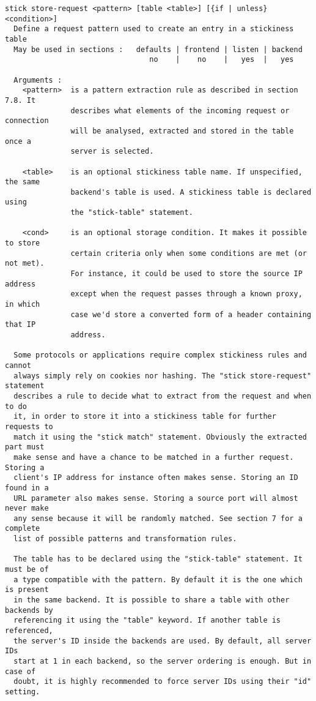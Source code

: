 \begin{verbatim}
stick store-request <pattern> [table <table>] [{if | unless} <condition>]
  Define a request pattern used to create an entry in a stickiness table
  May be used in sections :   defaults | frontend | listen | backend
                                 no    |    no    |   yes  |   yes

  Arguments :
    <pattern>  is a pattern extraction rule as described in section 7.8. It
               describes what elements of the incoming request or connection
               will be analysed, extracted and stored in the table once a
               server is selected.

    <table>    is an optional stickiness table name. If unspecified, the same
               backend's table is used. A stickiness table is declared using
               the "stick-table" statement.

    <cond>     is an optional storage condition. It makes it possible to store
               certain criteria only when some conditions are met (or not met).
               For instance, it could be used to store the source IP address
               except when the request passes through a known proxy, in which
               case we'd store a converted form of a header containing that IP
               address.

  Some protocols or applications require complex stickiness rules and cannot
  always simply rely on cookies nor hashing. The "stick store-request" statement
  describes a rule to decide what to extract from the request and when to do
  it, in order to store it into a stickiness table for further requests to
  match it using the "stick match" statement. Obviously the extracted part must
  make sense and have a chance to be matched in a further request. Storing a
  client's IP address for instance often makes sense. Storing an ID found in a
  URL parameter also makes sense. Storing a source port will almost never make
  any sense because it will be randomly matched. See section 7 for a complete
  list of possible patterns and transformation rules.

  The table has to be declared using the "stick-table" statement. It must be of
  a type compatible with the pattern. By default it is the one which is present
  in the same backend. It is possible to share a table with other backends by
  referencing it using the "table" keyword. If another table is referenced,
  the server's ID inside the backends are used. By default, all server IDs
  start at 1 in each backend, so the server ordering is enough. But in case of
  doubt, it is highly recommended to force server IDs using their "id" setting.


\end{verbatim}
